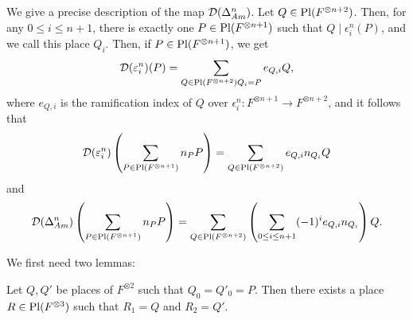 We give a precise description of the map \(\operatorname{\mathcal{D}}(\Delta_{Am}^n)\). Let \(Q \in \operatorname{Pl}(F^{\otimes n+2})\). Then, for any \(0 \leq i \leq n+1\), there is exactly one \(P \in \operatorname{Pl}(F^{\otimes n+1})\) such that \(Q \mid \epsilon_i^n(P)\), and we call this place \(Q_i\). Then, if \(P \in \operatorname{Pl}(F^{\otimes n+1})\), we get
\[\operatorname{\mathcal{D}}(\varepsilon_i^n)(P) = \sum_{\substack Q \in \operatorname{Pl}(F^{\otimes n+2}) \\ Q_i = P} e_{Q,i} Q,\]
where \(e_{Q,i}\) is the ramification index of \(Q\) over \(\epsilon_i^n\colon F^{\otimes n+1} \to F^{\otimes n+2}\), and it follows that 
\[\operatorname{\mathcal{D}}(\varepsilon_i^n)\left(\sum_{P \in \operatorname{Pl}(F^{\otimes n+1})} n_P P\right) = \sum_{Q \in \operatorname{Pl}(F^{\otimes n+2})} e_{Q,i} n_{Q_i} Q\]
and
\[\operatorname{\mathcal{D}}(\Delta_{Am}^n)\left(\sum_{P \in \operatorname{Pl}(F^{\otimes n+1})} n_P P\right) = \sum_{Q \in \operatorname{Pl}(F^{\otimes n+2})} \left(\sum_{0 \leq i \leq {n+1}} (-1)^i e_{Q,i} n_{Q_i} \right) Q.\]

We first need two lemmas:

\begin{lemma}\label{lemma:CocycleTransit}
    Let \(Q,Q'\) be places of \(F^{\otimes 2}\) such that \(Q_0 = Q'_0 = P\). Then there exists a place \(R \in \operatorname{Pl}(F^{\otimes 3})\) such that \(R_1 = Q\) and \(R_2 = Q'\).
\end{lemma}


